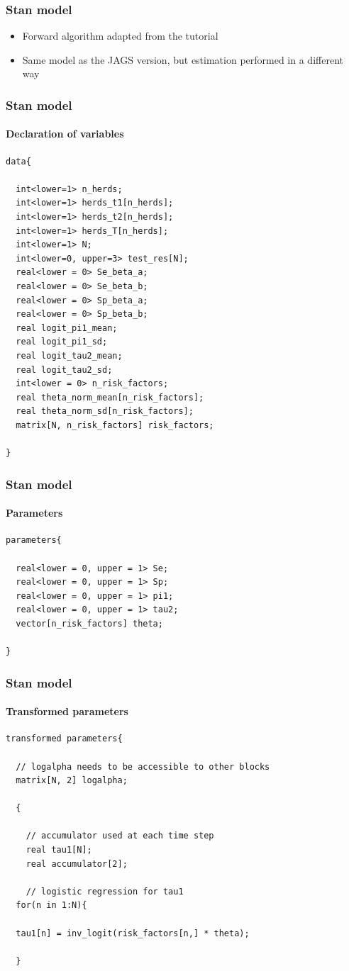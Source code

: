 \documentclass{beamer}
\begin{document}
\begin{frame}
\frametitle{Stan model}
\begin{itemize}
 \item{Forward algorithm adapted from the tutorial}
 \item{Same model as the JAGS version, but estimation performed in a different way}
\end{itemize}
\end{frame}

\begin{frame}[fragile]
\frametitle{Stan model}
\framesubtitle{Declaration of variables}
\scriptsize
\begin{verbatim}
data{

  int<lower=1> n_herds;
  int<lower=1> herds_t1[n_herds];
  int<lower=1> herds_t2[n_herds];
  int<lower=1> herds_T[n_herds];
  int<lower=1> N;
  int<lower=0, upper=3> test_res[N];
  real<lower = 0> Se_beta_a;
  real<lower = 0> Se_beta_b;
  real<lower = 0> Sp_beta_a;
  real<lower = 0> Sp_beta_b;
  real logit_pi1_mean;
  real logit_pi1_sd;
  real logit_tau2_mean;
  real logit_tau2_sd;
  int<lower = 0> n_risk_factors;
  real theta_norm_mean[n_risk_factors];
  real theta_norm_sd[n_risk_factors];
  matrix[N, n_risk_factors] risk_factors;

}
\end{verbatim}
\end{frame}



\begin{frame}[fragile]
\frametitle{Stan model}
\framesubtitle{Parameters}
\scriptsize
\begin{verbatim}
parameters{

  real<lower = 0, upper = 1> Se;
  real<lower = 0, upper = 1> Sp;
  real<lower = 0, upper = 1> pi1;
  real<lower = 0, upper = 1> tau2;
  vector[n_risk_factors] theta;

}
\end{verbatim}
\end{frame}


\begin{frame}[fragile]
\frametitle{Stan model}
\framesubtitle{Transformed parameters}
\scriptsize
\begin{verbatim}
transformed parameters{

  // logalpha needs to be accessible to other blocks
  matrix[N, 2] logalpha;

  {

    // accumulator used at each time step
    real tau1[N];
    real accumulator[2];

    // logistic regression for tau1
  for(n in 1:N){

  tau1[n] = inv_logit(risk_factors[n,] * theta);

  }
\end{verbatim}

\end{frame}
\end{document}
